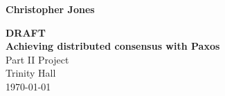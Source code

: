 \documentclass[12pt,twoside,notitlepage]{report}
\begin{document}
\lstset{
   language=[Objective]Caml
}





\pagestyle{empty}

\hfill{\LARGE \bf Christopher Jones}

\vspace*{60mm}
\begin{center}
\Huge
{\bf \color{red} DRAFT} \\
{\bf Achieving distributed consensus with Paxos} \\
\vspace*{5mm}
Part II Project \\
\vspace*{5mm}
Trinity Hall \\
\vspace*{5mm}
\today  %
\end{center}

\cleardoublepage



\setcounter{page}{1}
\pagestyle{plain}


\end{document}
